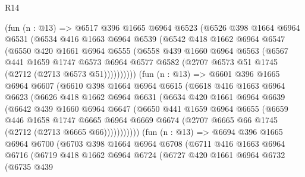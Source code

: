\begin{lexlean}{R14}
\begin{coremodule}
        (fun (n : @13) =>
        @6517
          @396
          @1665
          @6964
          @6523
          (@6526
            @398
            @1664
            @6964
            @6531
            (@6534
              @416
              @1663
              @6964
              @6539
              (@6542
                @418
                @1662
                @6964
                @6547
                (@6550
                  @420
                  @1661
                  @6964
                  @6555
                  (@6558
                    @439
                    @1660
                    @6964
                    @6563
                    (@6567
                      @441
                      @1659
                      @1747
                      @6573
                      @6964
                      @6577
                      @6582
                      (@2707 @6573 @51 @1745 (@2712 (@2713 @6573 @51))))))))))
        (fun (n : @13) =>
        @6601
          @396
          @1665
          @6964
          @6607
          (@6610
            @398
            @1664
            @6964
            @6615
            (@6618
              @416
              @1663
              @6964
              @6623
              (@6626
                @418
                @1662
                @6964
                @6631
                (@6634
                  @420
                  @1661
                  @6964
                  @6639
                  (@6642
                    @439
                    @1660
                    @6964
                    @6647
                    (@6650
                      @441
                      @1659
                      @6964
                      @6655
                      (@6659
                        @446
                        @1658
                        @1747
                        @6665
                        @6964
                        @6669
                        @6674
                        (@2707 @6665 @66 @1745 (@2712 (@2713 @6665 @66)))))))))))
        (fun (n : @13) =>
        @6694
          @396
          @1665
          @6964
          @6700
          (@6703
            @398
            @1664
            @6964
            @6708
            (@6711
              @416
              @1663
              @6964
              @6716
              (@6719
                @418
                @1662
                @6964
                @6724
                (@6727
                  @420
                  @1661
                  @6964
                  @6732
                  (@6735
                    @439

\end{coremodule}
\end{lexlean}
